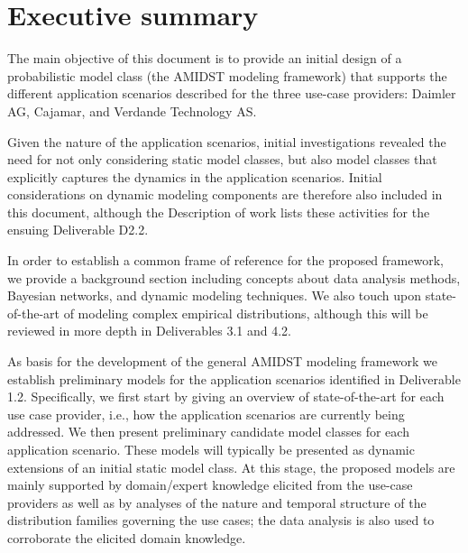 \section{Executive summary}\label{section:executiveSummary}

The main objective of this document is to provide an initial design of a probabilistic model class (the AMIDST modeling
framework) that supports the different application scenarios described for the three use-case providers: Daimler AG, Cajamar, and Verdande Technology AS.



Given the nature of the application scenarios, initial investigations revealed the need for not only considering static
model classes, but also model classes that explicitly captures the  dynamics in the application scenarios. Initial considerations on
dynamic modeling components are therefore also included in this document, although the Description of work
lists these activities for the ensuing Deliverable D2.2. 

In order to establish a common frame of reference for the proposed framework, we provide a background section including
concepts about data analysis methods, Bayesian networks, and dynamic modeling techniques. We also touch upon
state-of-the-art of modeling complex empirical distributions, although this will be reviewed in more depth in Deliverables
3.1 and 4.2. 

As basis for the development of the general AMIDST modeling framework we establish preliminary models for the application scenarios identified in
Deliverable 1.2. Specifically, we first start by giving an overview of state-of-the-art for each use case provider, i.e., how the
application scenarios are currently being addressed. We then present preliminary candidate model classes for each
application scenario. These models will typically be presented as dynamic extensions of an initial static model class. At
this stage, the proposed models are mainly supported by  domain/expert knowledge elicited from the use-case providers
as well as by analyses of the nature and temporal structure of the distribution families governing the use cases; the data
analysis is also used to corroborate the elicited domain knowledge.

